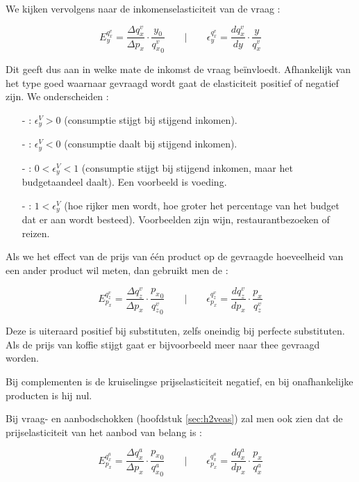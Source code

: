 We kijken vervolgens naar de inkomenselasticiteit van de vraag : 

$$E_{y}^{q_x^v} = \frac{\Delta {q_x^v}}{\Delta {p_x}}\cdot\frac{{y}_0}{{q_x^v}_0}
\qquad | \qquad
\epsilon_{y}^{q_x^v}=\frac{d{q_x^v}}{d{y}}\cdot\frac{{y}}{{q_x^v}}$$

Dit geeft dus aan in welke mate de inkomst de vraag be\"invloedt. Afhankelijk van het type goed waarnaar gevraagd wordt gaat de elasticiteit positief of negatief zijn. We onderscheiden :
\begin{itemize}
\item[-]  : $\epsilon_y^V>0$ (consumptie stijgt bij stijgend inkomen).
\item[-]  : $\epsilon_y^V<0$ (consumptie daalt bij stijgend inkomen).
\item[-]  : $0<\epsilon_y^V<1$ (consumptie stijgt bij stijgend inkomen, maar het budgetaandeel daalt). Een voorbeeld is voeding.
\item[-]  : $1<\epsilon_y^V$ (hoe rijker men wordt, hoe groter het percentage van het budget dat er aan wordt besteed). Voorbeelden zijn wijn, restaurantbezoeken of reizen.
\end{itemize}

Als we het effect van de prijs van \'e\'en product op de gevraagde hoeveelheid van een ander product wil meten, dan gebruikt men de  :

$$E_{p_x}^{q_z^v} = \frac{\Delta {q_z^v}}{\Delta {p_x}}\cdot\frac{{p_x}_0}{{q_z^v}_0}
\qquad | \qquad
\epsilon_{p_x}^{q_z^v}=\frac{d{q_z^v}}{d{p_x}}\cdot\frac{{p_x}}{{q_z^v}}$$

Deze is uiteraard positief bij substituten, zelfs oneindig bij perfecte substituten. Als de prijs van koffie stijgt gaat er bijvoorbeeld meer naar thee gevraagd worden.
\par Bij complementen is de kruiselingse prijselasticiteit negatief, en bij onafhankelijke producten is hij nul.\\

\par Bij vraag- en aanbodschokken (hoofdstuk \ref{sec:h2veas}) zal men ook zien dat de prijselasticiteit van het aanbod van belang is :

$$E_{p_x}^{q_x^a} = \frac{\Delta {q_x^a}}{\Delta {p_x}}\cdot\frac{{p_x}_0}{{q_x^a}_0}
\qquad | \qquad
\epsilon_{p_x}^{q_x^a}=\frac{d{q_x^a}}{d{p_x}}\cdot\frac{{p_x}}{{q_x^a}}$$

